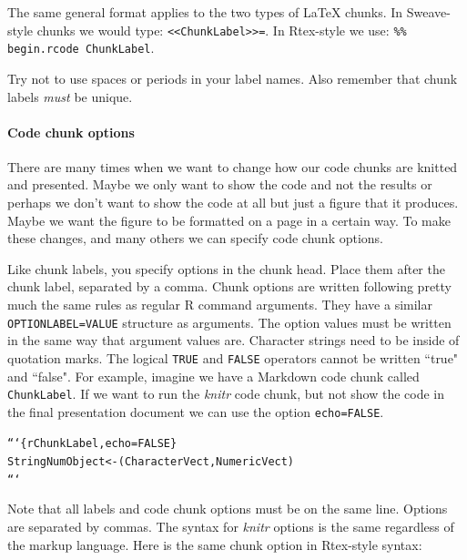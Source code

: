 \documentclass[krantz1]{krantz}
\begin{document}
\noindent The same general format applies to the two types of LaTeX chunks. In Sweave-style chunks we would type: \texttt{\textless\textless ChunkLabel\textgreater\textgreater=}. In Rtex-style we use: \texttt{\%\% begin.rcode ChunkLabel}.

Try not to use spaces or periods in your label names. Also remember that chunk labels {\emph{must}} be unique.

\paragraph{Code chunk options}

There are many times when we want to change how our code chunks are knitted and presented. Maybe we only want to show the code and not the results or perhaps we don't want to show the code at all but just a figure that it produces. Maybe we want the figure to be formatted on a page in a certain way. To make these changes, and many others we can specify code chunk options.

Like chunk labels, you specify options in the chunk head. Place them after the chunk label, separated by a comma. Chunk options are written following pretty much the same rules as regular R command arguments. They have a similar \texttt{OPTIONLABEL=VALUE} structure as arguments. The option values must be written in the same way that argument values are. Character strings need to be inside of quotation marks. The logical \texttt{TRUE} and \texttt{FALSE} operators cannot be written ``true" and ``false". For example, imagine we have a Markdown code chunk called \texttt{ChunkLabel}. If we want to run the {\emph{knitr}} code chunk, but not show the code in the final presentation document we can use the option \texttt{echo=FALSE}. 

\begin{knitrout}
\color{fgcolor}\begin{kframe}
\begin{alltt}
```\{r ChunkLabel, echo=FALSE\}
StringNumObject <- (CharacterVect, NumericVect)
```
\end{alltt}
\end{kframe}
\end{knitrout}


\noindent Note that all labels and code chunk options must be on the same line. Options are separated by commas. The syntax for {\emph{knitr}} options is the same regardless of the markup language. Here is the same chunk option in Rtex-style syntax:
\end{document}
